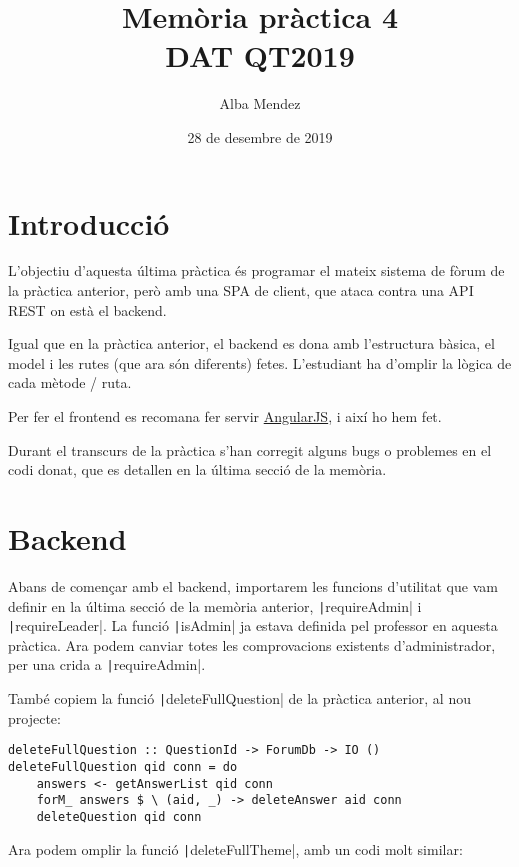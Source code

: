 \documentclass[catalan, a4paper]{scrartcl}
\author{Alba Mendez}
\title{Memòria pràctica 4\\
{\small DAT QT2019}}
\date{28 de desembre de 2019}
\begin{document}
\maketitle


\section{Introducció}

L'objectiu d'aquesta última pràctica és programar el mateix sistema de fòrum
de la pràctica anterior, però amb una SPA de client, que ataca contra una API
REST on està el backend.

Igual que en la pràctica anterior, el backend es dona amb l'estructura bàsica,
el model i les rutes (que ara són diferents) fetes. L'estudiant ha d'omplir
la lògica de cada mètode / ruta.

Per fer el frontend es recomana fer servir \href{https://angularjs.org/}{AngularJS},
i així ho hem fet.

Durant el transcurs de la pràctica s'han corregit alguns bugs o problemes en el
codi donat, que es detallen en la última secció de la memòria.

\section{Backend}

Abans de començar amb el backend, importarem les funcions d'utilitat que vam
definir en la última secció de la memòria anterior, \texttt|requireAdmin|
i \texttt|requireLeader|. La funció \texttt|isAdmin|
ja estava definida pel professor en aquesta pràctica. Ara podem canviar totes
les comprovacions existents d'administrador, per una crida a
\texttt|requireAdmin|.

També copiem la funció \texttt|deleteFullQuestion| de la
pràctica anterior, al nou projecte:

\begin{verbatim}
deleteFullQuestion :: QuestionId -> ForumDb -> IO ()
deleteFullQuestion qid conn = do
    answers <- getAnswerList qid conn
    forM_ answers $ \ (aid, _) -> deleteAnswer aid conn
    deleteQuestion qid conn
\end{verbatim}

Ara podem omplir la funció \texttt|deleteFullTheme|,
amb un codi molt similar:
\end{document}
